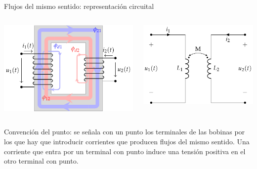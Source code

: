 \documentclass[aspectratio=169, usenames,svgnames,dvipsnames]{beamer}
\begin{document}
\begin{frame}[label={sec:orgaeba8b8}]{Flujos del mismo sentido: representación circuital}
\begin{columns}
\begin{column}{0.5\columnwidth}
\begin{center}
\includegraphics[width=.9\linewidth]{../figs/acoplamientoTikz.pdf}
\end{center}
\end{column}

\begin{column}{0.5\columnwidth}
\begin{center}
\includegraphics[width=.9\linewidth]{../figs/acoplamiento_circuito.pdf}
\end{center}
\end{column}
\end{columns}

\alert{Convención del punto}: se señala con un punto los terminales de las
bobinas por los que hay que introducir corrientes que producen flujos
del mismo sentido. Una corriente que entra por un terminal con punto
induce una tensión positiva en el otro terminal con punto.
\end{frame}
\end{document}

